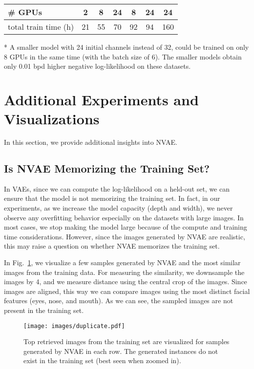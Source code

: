 \documentclass{article}
\begin{document}
\begin{table*}
{\begin{threeparttable}
\begin{tabular}{lcccccc}
        \# GPUs                & 2 & 8 & 24 & 8 & 24\tnote{*} & 24\tnote{*} \\ \hline
        total train time (h)   & 21 & 55 & 70 & 92 & 94 & 160\\ 
        \bottomrule
        \end{tabular}
        \begin{tablenotes}\footnotesize
        \item[*] A smaller model with 24 initial channels instead of 32, could be trained on only 8 GPUs in the same time (with the batch size of 6). The smaller models obtain only 0.01 bpd higher negative log-likelihood on these datasets.
        \end{tablenotes}
        \end{threeparttable}
}
\end{table*} 

\section{Additional Experiments and Visualizations}
In this section, we provide additional insights into NVAE.

\subsection{Is NVAE Memorizing the Training Set?}
In VAEs, since we can compute the log-likelihood on a held-out set, we can ensure that the model is not memorizing the training set. In fact, in our experiments, as we increase the model capacity (depth and width), we never observe any overfitting behavior especially on the datasets with large images. In most cases, we stop making the model large because of the compute and training time considerations. However, since the images generated by NVAE are realistic, this may raise a question on whether NVAE memorizes the training set.

In Fig.~\ref{fig:dup}, we visualize a few samples generated by NVAE and the most similar images from the training data. For measuring the similarity, we downsample the images by 4, and we measure  distance using the central crop of the images. Since images are aligned, this way we can compare images using the most distinct facial features (eyes, nose, and mouth). As we can see, the sampled images are not present in the training set.


\begin{figure}
\centering
\texttt{[image: images/duplicate.pdf]}
\caption{Top retrieved images from the training set are visualized for samples generated by NVAE in each row. The generated instances do not exist in the training set (best seen when zoomed in).}
\label{fig:dup}
\end{figure}
\end{document}
